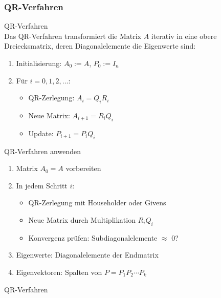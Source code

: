\subsubsection{QR-Verfahren}

\begin{concept}{QR-Verfahren}\\
Das QR-Verfahren transformiert die Matrix $A$ iterativ in eine obere Dreiecksmatrix, deren Diagonalelemente die Eigenwerte sind:
\begin{enumerate}
    \item Initialisierung: $A_0 := A$, $P_0 := I_n$
    \item Für $i = 0,1,2,\ldots$:
    \begin{itemize}
        \item QR-Zerlegung: $A_i = Q_iR_i$
        \item Neue Matrix: $A_{i+1} = R_iQ_i$
        \item Update: $P_{i+1} = P_iQ_i$
    \end{itemize}
\end{enumerate}
\end{concept}

\begin{KR}{QR-Verfahren anwenden}
\begin{enumerate}
    \item Matrix $A_0 = A$ vorbereiten
    \item In jedem Schritt $i$:
    \begin{itemize}
        \item QR-Zerlegung mit Householder oder Givens
        \item Neue Matrix durch Multiplikation $R_iQ_i$
        \item Konvergenz prüfen: Subdiagonalelemente $\approx$ 0?
    \end{itemize}
    \item Eigenwerte: Diagonalelemente der Endmatrix
    \item Eigenvektoren: Spalten von $P = P_1P_2\cdots P_k$
\end{enumerate}
\end{KR}

\begin{example2}{QR-Verfahren}
\end{example2}

